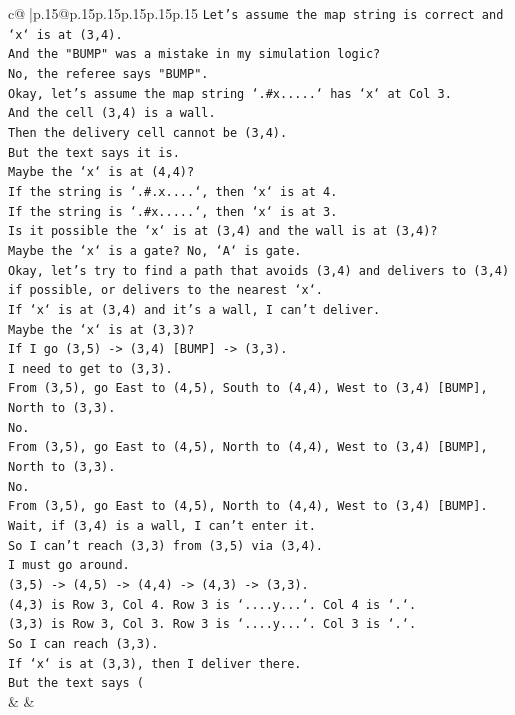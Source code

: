 \documentclass{article}
\begin{document}
{\begin{supertabular}{c@{$\;$}|p{.15\linewidth}@{}p{.15\linewidth}p{.15\linewidth}p{.15\linewidth}p{.15\linewidth}p{.15\linewidth}}
{{{\texttt{Let's assume the map string is correct and `x` is at (3,4).} \\
\texttt{And the "BUMP" was a mistake in my simulation logic?} \\
\texttt{No, the referee says "BUMP".} \\
\texttt{Okay, let's assume the map string `.\#x.....` has `x` at Col 3.} \\
\texttt{And the cell (3,4) is a wall.} \\
\texttt{Then the delivery cell cannot be (3,4).} \\
\texttt{But the text says it is.} \\
\texttt{Maybe the `x` is at (4,4)?} \\
\texttt{If the string is `.\#.x....`, then `x` is at 4.} \\
\texttt{If the string is `.\#x.....`, then `x` is at 3.} \\
\texttt{Is it possible the `x` is at (3,4) and the wall is at (3,4)?} \\
\texttt{Maybe the `x` is a gate? No, `A` is gate.} \\
\texttt{Okay, let's try to find a path that avoids (3,4) and delivers to (3,4) if possible, or delivers to the nearest `x`.} \\
\texttt{If `x` is at (3,4) and it's a wall, I can't deliver.} \\
\texttt{Maybe the `x` is at (3,3)?} \\
\texttt{If I go (3,5) {-}> (3,4) {[}BUMP{]} {-}> (3,3).} \\
\texttt{I need to get to (3,3).} \\
\texttt{From (3,5), go East to (4,5), South to (4,4), West to (3,4) {[}BUMP{]}, North to (3,3).} \\
\texttt{No.} \\
\texttt{From (3,5), go East to (4,5), North to (4,4), West to (3,4) {[}BUMP{]}, North to (3,3).} \\
\texttt{No.} \\
\texttt{From (3,5), go East to (4,5), North to (4,4), West to (3,4) {[}BUMP{]}.} \\
\texttt{Wait, if (3,4) is a wall, I can't enter it.} \\
\texttt{So I can't reach (3,3) from (3,5) via (3,4).} \\
\texttt{I must go around.} \\
\texttt{(3,5) {-}> (4,5) {-}> (4,4) {-}> (4,3) {-}> (3,3).} \\
\texttt{(4,3) is Row 3, Col 4. Row 3 is `....y...`. Col 4 is `.`.} \\
\texttt{(3,3) is Row 3, Col 3. Row 3 is `....y...`. Col 3 is `.`.} \\
\texttt{So I can reach (3,3).} \\
\texttt{If `x` is at (3,3), then I deliver there.} \\
\texttt{But the text says (} \\
            }
        }
    }
    & & \\ \\


\end{supertabular}}
\end{document}
